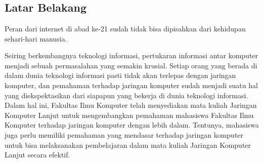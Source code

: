 \chapter{\babSatu}
\label{bab:1}


\section{Latar Belakang}
\label{sec:latarBelakang}
Peran dari internet di abad ke-21 sudah tidak bisa dipisahkan dari kehidupan sehari-hari manusia.  

Seiring berkembangnya teknologi informasi, pertukaran informasi antar komputer menjadi sebuah permasalahan yang semakin krusial. 
Setiap orang yang berada di dalam dunia teknologi informasi pasti tidak akan terlepas dengan jaringan komputer, dan pemahaman 
terhadap jaringan komputer sudah menjadi suatu hal yang diekspektasikan dari siapapun yang bekerja di dunia teknologi informasi. 
Dalam hal ini, Fakultas Ilmu Komputer telah menyediakan mata kuliah Jaringan Komputer Lanjut untuk mengembangkan pemahaman mahasiswa 
Fakultas Ilmu Komputer terhadap jaringan komputer dengan lebih dalam. Tentunya, mahasiswa juga perlu memiliki pemahaman yang mendasar 
terhadap jaringan komputer untuk bisa melaksanakan pembelajaran dalam mata kuliah Jaringan Komputer Lanjut secara efektif. \par

